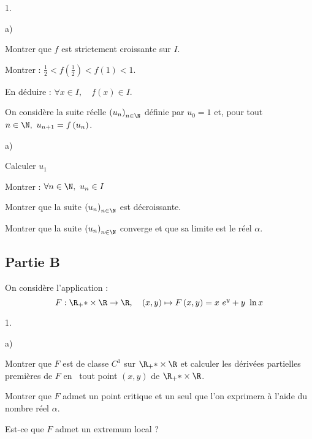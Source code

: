 \documentclass[11pt]{article}%
\begin{document}
\begin{noliste}{1.}
 \setlength{\itemsep}{4mm}
\item 
\begin{noliste}{a)}
 \setlength{\itemsep}{2mm}
\item Montrer que $f$ est strictement croissante sur $I$.

\item Montrer : $\frac{1}{2}<f\left( \frac{1}{2}\right) <f\left(
1\right) <1.
$

\item En déduire : $\forall x\in I,\quad f\left( x\right) \in I.$
\end{noliste}

\item On considère la suite réelle $\left( u_{n}\right)_{n\in 
\N}$ définie par $u_{0} = 1$ et, pour tout $n\in \N,\
u_{n + 1} = f\left( u_{n}\right) $.

\begin{noliste}{a)}
 \setlength{\itemsep}{2mm}
\item Calculer $u_{1}$

\item Montrer : $\forall n\in \N,\ u_{n}\in I$

\item Montrer que la suite $\left( u_{n}\right)_{n\in \N}$ est
décroissante.

\item Montrer que la suite $\left( u_{n}\right)_{n\in \N}$ converge
et que sa limite est le réel $\alpha $.
\end{noliste}
\end{noliste}

\subsection*{Partie B}

On considère l'application :
\[
F :\R_{+}{\ast }\times \R\rightarrow \R,\quad \left(
x,y\right) \mapsto F\left( x,y\right) = x~e^{y} + y~\ln x
\]

\begin{noliste}{1.}
 \setlength{\itemsep}{4mm}
\item 
\begin{noliste}{a)}
 \setlength{\itemsep}{2mm}
\item Montrer que $F$ est de classe $C^{1}$ sur $\R_{+}{\ast
}\times \R$ et calculer les dérivées partielles premières de $F$ en \
tout point $\left( x,y\right) $ de $\R_{+}{\ast
}\times \R$.

\item Montrer que $F$ admet un point critique et un seul que l'on
exprimera 
à l'aide du nombre réel $\alpha $.
\end{noliste}

\item Est-ce que $F$ admet un extremum local ?
\end{noliste}
\end{document}
